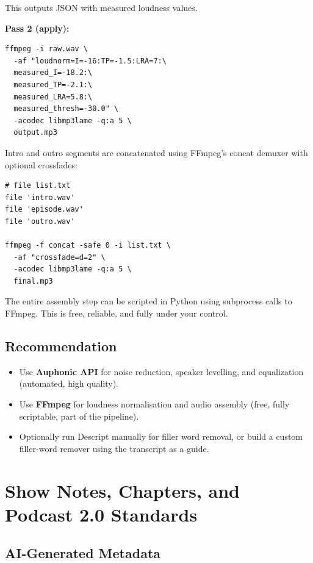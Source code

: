 \documentclass[11pt,letterpaper]{article}
\begin{document}
This outputs JSON with measured loudness values.

\textbf{Pass 2 (apply):}

\begin{verbatim}
ffmpeg -i raw.wav \
  -af "loudnorm=I=-16:TP=-1.5:LRA=7:\
  measured_I=-18.2:\
  measured_TP=-2.1:\
  measured_LRA=5.8:\
  measured_thresh=-30.0" \
  -acodec libmp3lame -q:a 5 \
  output.mp3
\end{verbatim}

Intro and outro segments are concatenated using FFmpeg's concat demuxer with optional crossfades:

\begin{verbatim}
# file list.txt
file 'intro.wav'
file 'episode.wav'
file 'outro.wav'

ffmpeg -f concat -safe 0 -i list.txt \
  -af "crossfade=d=2" \
  -acodec libmp3lame -q:a 5 \
  final.mp3
\end{verbatim}

The entire assembly step can be scripted in Python using subprocess calls to FFmpeg. This is free, reliable, and fully under your control.

\subsection{Recommendation}

\begin{itemize}
  \item Use \textbf{Auphonic API} for noise reduction, speaker levelling, and equalization (automated, high quality).
  \item Use \textbf{FFmpeg} for loudness normalisation and audio assembly (free, fully scriptable, part of the pipeline).
  \item Optionally run Descript manually for filler word removal, or build a custom filler-word remover using the transcript as a guide.
\end{itemize}

\vspace{12pt}

\section{Show Notes, Chapters, and Podcast 2.0 Standards}

\subsection{AI-Generated Metadata}
\end{document}
